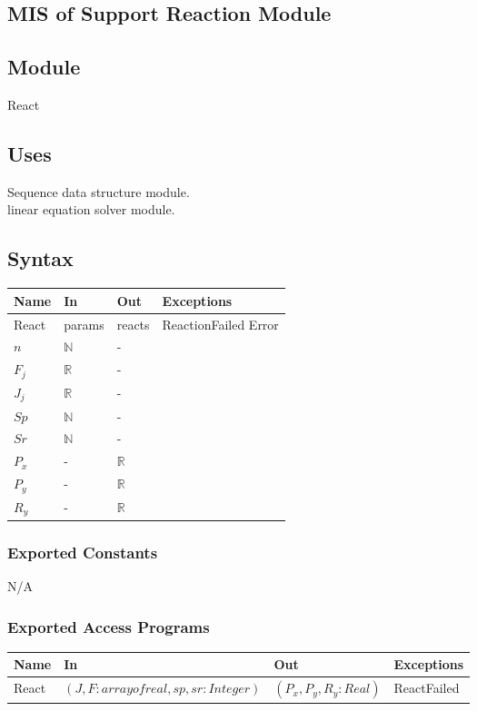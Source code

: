 \documentclass[12pt, titlepage]{article}
\begin{document}
\subsection{MIS of Support Reaction Module \label{mSpec} }

\subsection{Module}

React

\subsection{Uses}
Sequence data structure module.\\
linear equation solver module.\\

\subsection{Syntax}
\begin{tabular}{p{3cm} p{1cm} p{1cm} >{\raggedright\arraybackslash}p{9cm}}
\toprule
\textbf{Name} & \textbf{In} & \textbf{Out} & \textbf{Exceptions} \\
\midrule
React & params & reacts &  ReactionFailed Error \\

$n$ &  $\mathbb{N}$&-\\
$F_j$ &  $\mathbb{R}$&-\\
$J_j$ &  $\mathbb{R}$&-\\
$Sp$ &  $\mathbb{N}$&-\\
$Sr$ &  $\mathbb{N}$ &-\\
$P_x$ & - & $\mathbb{R}$\\
$P_y$ & - & $\mathbb{R}$\\
$R_y$ & - & $\mathbb{R}$\\

\bottomrule
\end{tabular}
\subsubsection{Exported Constants}
N/A
\subsubsection{Exported Access Programs}
\begin{center}
\begin{tabular}{p{2cm} p{4cm} p{4cm} p{2cm}}
\hline
\textbf{Name} & \textbf{In} & \textbf{Out} & \textbf{Exceptions} \\
\hline
React& $(J,F: array of real,sp,sr: Integer)$ & $(P_x,P_y,R_y: Real)$ & ReactFailed \\
\hline
\end{tabular}
\end{center}
\end{document}
